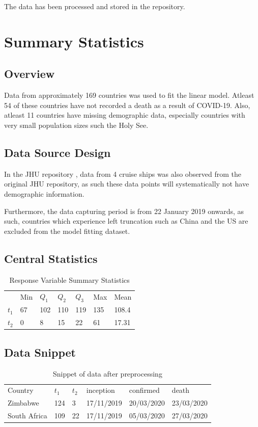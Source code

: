 \documentclass[]{report}
\begin{document}
The data has been processed and stored in the repository.


\section{Summary Statistics}

\subsection*{Overview}

Data from approximately 169 countries was used to fit the linear model. Atleast 54 of these countries have not recorded a death as a result of COVID-19. Also, atleast 11 countries have missing demographic data, especially countries with very small population sizes such the Holy See. 

\subsection*{Data Source Design}

In the JHU repository \cite{jhu}, data from 4 cruise ships was also observed from the original JHU repository, as such these data points will systematically not have demographic information. 

Furthermore, the data capturing period is from 22 January 2019 onwards, as such, countries which experience left truncation such as China and the US are excluded from the model fitting dataset.

\newpage

\subsection*{Central Statistics}

\begin{table}[htb]
	\centering
	\caption{Response Variable Summary Statistics}
	\begin{tabular}{lllllll}
		& Min & $Q_1$ & $Q_2$ & $Q_3$ & Max & Mean  \\
		$t_1$ & 67  & 102   & 110   & 119   & 135 & 108.4 \\
		$t_2$ & 0   & 8     & 15    & 22    & 61  & 17.31
	\end{tabular}
\end{table}

\subsection*{Data Snippet}
\begin{table}[htb]
	\centering
	\caption{Snippet of data after preprocessing \cite{covidsa}}
	\label{snippet1}
	\begin{tabular}{llllll}
		Country      & $t_1$  & $t_2$ & inception  & confirmed  & death      \\
		Zimbabwe     & 124 & 3  & 17/11/2019 & 20/03/2020 & 23/03/2020 \\
		South Africa & 109 & 22 & 17/11/2019 & 05/03/2020 & 27/03/2020
	\end{tabular}
\end{table}
\end{document}
